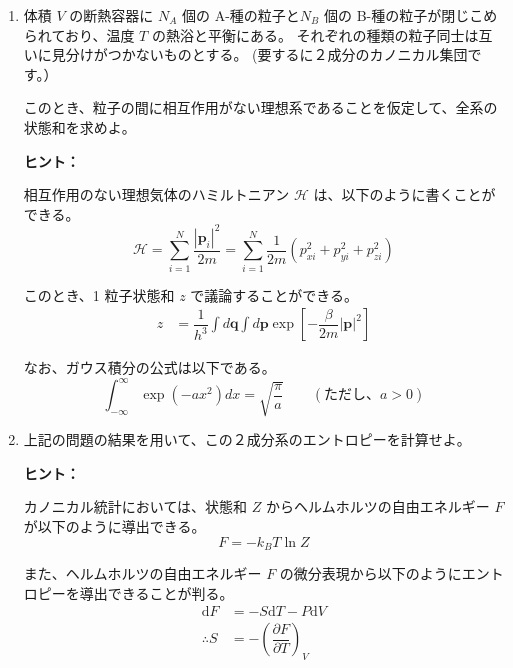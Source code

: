 \documentclass[uplatex,dvipdfmx,a4paper,11pt]{jsarticle}
\newcommand{\diff}{\mathrm d}
\begin{document}
\vspace{8pt}
\begin{enumerate}
\setlength{\parskip}{0cm} %
\setlength{\itemsep}{0.3cm} %

\item
体積 $V$ の断熱容器に $N_A$ 個の A-種の粒子と$N_B$ 個の B-種の粒子が閉じこめられており、温度 $T$ の熱浴と平衡にある。
それぞれの種類の粒子同士は互いに見分けがつかないものとする。
(要するに２成分のカノニカル集団です。）

このとき、粒子の間に相互作用がない理想系であることを仮定して、全系の状態和を求めよ。


\begin{itembox}[l]{{\bf ヒント：}}

相互作用のない理想気体のハミルトニアン $\mathcal{H}$ は、以下のように書くことができる。
\begin{equation*}
	\mathcal{H} = \sum^N_{i=1}\dfrac{|\bm{p}_i|^2}{2m} = \sum^N_{i=1} \dfrac{1}{2m}(p_{xi}^2 + p_{yi}^2 +p_{zi}^2)
        \label{eq:H_ideal}
\end{equation*}

このとき、1 粒子状態和 $z$ で議論することができる。
\begin{align*}
	z 	&= \dfrac{1}{h^{3}} \int d\bm{q} \int d\bm{p} \exp \left[ -\dfrac{\beta}{2m} |\bm{p}|^2 \right] 
\end{align*}

なお、ガウス積分の公式は以下である。
\begin{equation*}
	\int_{-\infty}^{\infty} \exp(-ax^2)dx = \sqrt{\dfrac{\pi}{a}} \qquad (\text{ただし、$a > 0$}) 
        \label{eq:gauss_sekibunn}
\end{equation*}

\end{itembox}

\color{black}

\item
上記の問題の結果を用いて、この２成分系のエントロピーを計算せよ。

\begin{itembox}[l]{{\bf ヒント：}}

カノニカル統計においては、状態和 $Z$ からヘルムホルツの自由エネルギー $F$ が以下のように導出できる。
\begin{equation*}
F = -k_BT \ln Z
\end{equation*}  

また、ヘルムホルツの自由エネルギー $F$ の微分表現から以下のようにエントロピーを導出できることが判る。
\begin{align*}
\diff F &= -S \diff T - P \diff V \\
\therefore S &= -\left(\dfrac{\partial F}{\partial T} \right)_V
\end{align*}


\end{itembox}
\end{enumerate}
\end{document}

